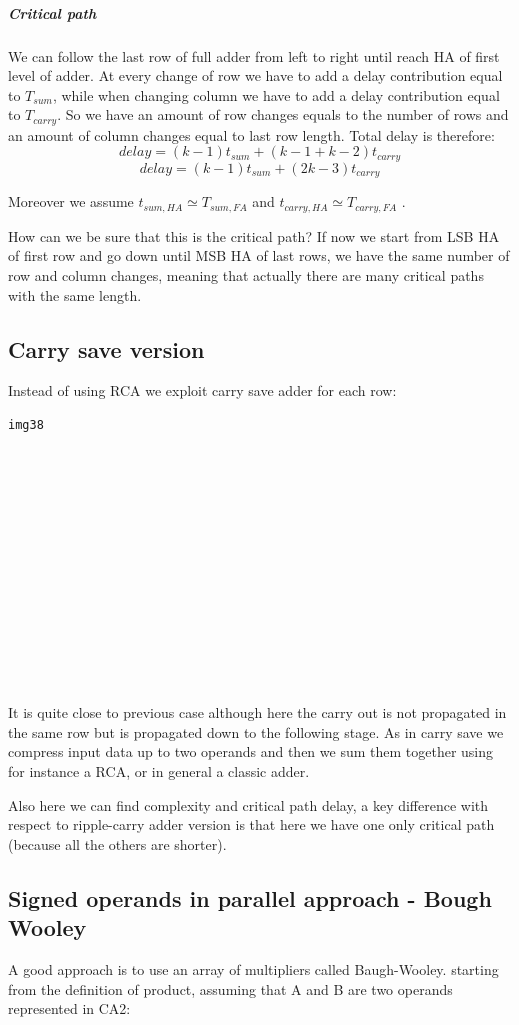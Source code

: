 \subparagraph{Critical path}
We can follow the last row of full adder from left to right until reach HA of first level of adder. At every change of row we have to add a delay contribution equal to $T_{sum}$, while when changing column we have to add a delay contribution equal to $T_{carry}$. So we have an amount of row changes equals to the number of rows and an amount of column changes equal to last row length. Total delay is therefore:
$$delay=(k-1)t_{sum}+(k-1+k-2)t_{carry}$$
$$delay=(k-1)t_{sum}+(2k-3)t_{carry}$$

Moreover we assume $t_{sum, HA} \simeq T_{sum, FA}$ and $t_{carry, HA} \simeq T_{carry, FA}$ .

How can we be sure that this is the critical path? If now we start from LSB HA of first row and go down until MSB HA of last rows, we have the same number of row and column changes, meaning that actually there are many critical paths with the same length.

\subsection{Carry save version}
Instead of using RCA we exploit carry save adder for each row:
\begin{verbatim}
img38














\end{verbatim}

It is quite close to previous case although here the carry out is not propagated in the same row but is propagated down to the following stage. As in carry save we compress input data up to two operands and then we sum them together using for instance a RCA, or in general a classic adder.

Also here we can find complexity and critical path delay, a key difference with respect to ripple-carry adder version is that here we have one only critical path (because all the others are shorter).

\subsection{Signed operands in parallel approach - Bough Wooley}
A good approach is to use an array of multipliers called Baugh-Wooley.
starting from the definition of product, assuming that A and B are two operands represented in CA2:

